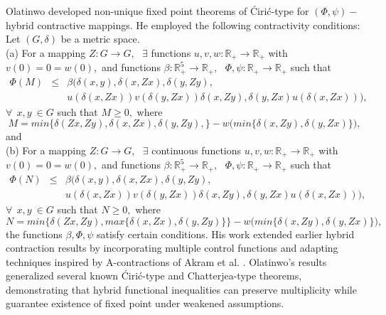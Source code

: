 \documentclass[11pt,reqno]{amsart}
\theoremstyle{definition}
\theoremstyle{remark}
\numberwithin{equation}{section}
\begin{document}
	Olatinwo  \cite{Olatinwo2019} developed non-unique fixed point theorems of Ćirić-type for $(\Phi,\psi)-$hybrid contractive mappings. He employed the following contractivity conditions: \cite{Olatinwo2019} Let $(G,\delta)$ be a metric space.\\
	(a) For a mapping $Z:G \to G,~~~\exists$ functions $u,v,w: \mathbb{R}_+ \to \mathbb{R}_+$ with $v(0)=0=w(0),$ and functions $\beta: \mathbb{R}^5_+ \to \mathbb{R}_+,~~~\Phi, \psi: \mathbb{R}_+ \to \mathbb{R}_+$ such that
	\begin{eqnarray*}
		\Phi(M) &\leq& \beta\Big(\delta(x,y), \delta(x,Zx), \delta(y,Zy),\\
		&& u(\delta(x,Zx))v(\delta(y,Zx))\delta(x,Zy), \delta(y,Zx)u(\delta(x,Zx))\Big),
	\end{eqnarray*}
	$\forall~~x,y~\in G$ such that $M \geq 0,$ where
	\begin{equation}
		M = min\{\delta(Zx,Zy), \delta(x,Zx), \delta(y,Zy),\}-w\Big(min\{\delta(x,Zy), \delta(y,Zx)\}\Big),
	\end{equation}
	and\\
	(b) For a mapping $Z:G \to G,~~~\exists$ continuous functions $u,v,w: \mathbb{R}_+ \to \mathbb{R}_+$ with $v(0)=0=w(0),$ and functions $\beta: \mathbb{R}^5_+ \to \mathbb{R}_+,~~~\Phi, \psi: \mathbb{R}_+ \to \mathbb{R}_+$ such that
	\begin{eqnarray*}
		\Phi(N) &\leq& \beta\Big(\delta(x,y), \delta(x,Zx), \delta(y,Zy),\\
		&& u(\delta(x,Zx))v(\delta(y,Zx))\delta(x,Zy), \delta(y,Zx)u(\delta(x,Zx))\Big),
	\end{eqnarray*}
	$\forall~~x,y~\in G$ such that $N \geq 0,$ where
	\begin{equation}
		N = min\{\delta(Zx,Zy), max\{\delta(x,Zx), \delta(y,Zy)\}\}-w\Big(min\{\delta(x,Zy), \delta(y,Zx)\}\Big),
	\end{equation}
	the functions $\beta, \Phi, \psi$ satisfy certain conditions. 
	His work extended earlier hybrid contraction results by incorporating multiple control functions and adapting techniques inspired by A-contractions of Akram et al. \cite{Akram2008}. Olatinwo’s results generalized several known Ćirić-type and Chatterjea-type theorems, demonstrating that hybrid functional inequalities can preserve multiplicity while guarantee existence of fixed point under weakened assumptions.
	
\end{document}
